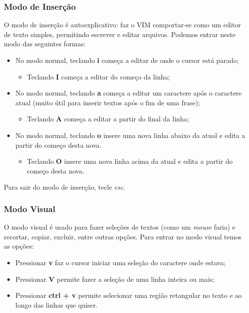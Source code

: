 \documentclass[12pt]{article}
\begin{document}
		\subsubsection{Modo de Inserção}
		O modo de inserção é autoexplicativo: faz o VIM comportar-se como um editor de texto simples, permitindo escrever e editar arquivos. Podemos entrar neste modo das seguintes formas:
		\begin{itemize}
			\item No modo normal, teclando \textbf{i} começa a editar de onde o cursor está parado;
			\begin{itemize}
				\item Teclando \textbf{I} começa a editar do começo da linha;
			\end{itemize}
			\item No modo normal, teclando \textbf{a} começa a editar um caractere após o caractere atual (muito útil para inserir textos após o fim de uma frase);
			\begin{itemize}
				\item Teclando \textbf{A} começa a editar a partir do final da linha;
			\end{itemize}
			\item No modo normal, teclando \textbf{o} insere uma nova linha abaixo da atual e edita a partir do começo desta nova.
			\begin{itemize}
				\item Teclando \textbf{O} insere uma nova linha acima da atual e edita a partir do começo desta nova.
			\end{itemize}
		\end{itemize}
		Para sair do modo de inserção, tecle \emph{esc}.
		\subsubsection{Modo Visual}
		O modo visual é usado para fazer seleções de textos (como um \emph{mouse} faria) e recortar, copiar, excluir, entre outras opções. Para entrar no modo visual temos as opções:
		\begin{itemize}
			\item Pressionar \textbf{v} faz o cursor iniciar uma seleção do caractere onde estava;
			\item Pressionar \textbf{V} permite fazer a seleção de uma linha inteira ou mais;
			\item Pressionar \textbf{ctrl + v} permite selecionar uma região retangular no texto e ao longo das linhas que quiser.  
		\end{itemize}
\end{document}
